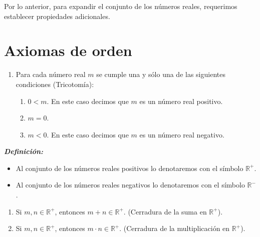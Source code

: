 \documentclass[11pt]{article}
\newcommand{\R}{\mathbb{R}}
\newcommand{\bfit}[1]{\textbf{\textit{#1}}}
\begin{document}
Por lo anterior, para expandir el conjunto de los números reales, requerimos establecer propiedades adicionales.

\section*{Axiomas de orden}

\begin{enumerate}[label=O\arabic*)]
    \item Para cada número real $m$ se cumple una y sólo una de las siguientes condiciones (Tricotomía):
        \begin{enumerate}[label=\roman*)]
        \item $0<m$. En este caso decimos que $m$ es un número real positivo.
        \item $m=0$.
        \item $m<0$. En este caso decimos que $m$ es un número real negativo.
        \end{enumerate}
\end{enumerate}
\bfit{Definición:} \begin{itemize}
    \item%
    Al conjunto de los números reales positivos lo denotaremos con el símbolo $\R^+$.
    \item%
    Al conjunto de los números reales negativos lo denotaremos con el símbolo $\R^-$.
\end{itemize}

\begin{enumerate}[label=O\arabic*),resume]
    \item Si $m, n \in \R^+$, entonces $m + n \in \R^+$. (Cerradura de la suma en $\R^+$).
    \item Si $m, n \in \R^+$, entonces $m \cdot n \in \R^+$. (Cerradura de la multiplicación en $\R^+$).
\end{enumerate}
\end{document}
